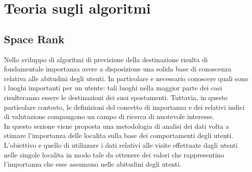 \chapter{Teoria sugli algoritmi}

\section{Space Rank}
Nello sviluppo di algoritmi di previsione della destinazione risulta di fondamentale
importanza avere a disposizione una solida base di conoscenza relativa alle
abitudini degli utenti. In particolare e necessario conoscere quali sono i luoghi
importanti per un utente: tali luoghi nella maggior parte dei casi risulteranno
essere le destinazioni dei suoi spostamenti. Tuttavia, in questo particolare
contesto, le definizioni del concetto di importanza e dei relativi indici di valutazione
compongono un campo di ricerca di nuotevole interesse.\\
In questo sezione viene proposta una metodologia di analisi dei dati volta
a stimare l'importanza delle localita sulla base dei comportamenti degli utenti.
L'obiettivo e quello di utilizzare i dati relativi alle visite effettuate dagli utenti
nelle singole localita in modo tale da ottenere dei valori che rappresentino
l'importanza che esse assumono nelle abitudini degli utenti.

